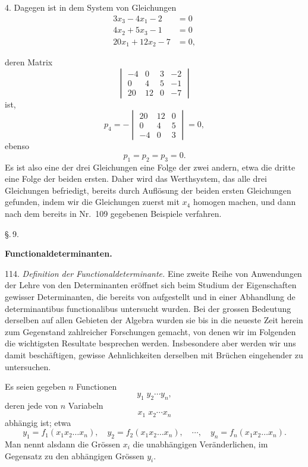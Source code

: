 4. Dagegen ist in dem System von Gleichungen
\[
\begin{aligned}
3x_3-4x_1-2&=0\\
4x_2+5x_3-1&=0\\
20x_1+12x_2-7&=0,
\end{aligned}
\]


deren Matrix
\[
\begin{vmatrix}
-4 & 0 & 3 & -2\\
0 & 4 & 5 & -1\\
20 & 12 & 0 & -7
\end{vmatrix}
\]
ist,
\[
p_4=-\begin{vmatrix} 20 & 12 & 0\\ 0 & 4 & 5\\ -4 & 0 & 3 \end{vmatrix}=0,
\]
ebenso
\[
p_1=p_2=p_3=0.
\]
Es ist also eine der drei Gleichungen eine Folge der zwei andern, etwa die dritte eine Folge der beiden ersten. Daher wird das Werthsystem, das alle drei Gleichungen befriedigt, bereits durch Auflösung der beiden ersten Gleichungen gefunden, indem wir die Gleichungen zuerst mit $x_4$ homogen machen, und dann nach dem bereits in Nr.\ 109 gegebenen Beispiele verfahren.

\begin{center}
\S.\,9.

\textbf{Functionaldeterminanten.}
\end{center}

114. \textit{Definition der Functionaldeterminante.} Eine zweite Reihe von Anwendungen der Lehre von den Determinanten eröffnet sich beim Studium der Eigenschaften gewisser Determinanten, die bereits von  aufgestellt und in einer Abhandlung \glqq de determinantibus functionalibus\grqq{} untersucht wurden. Bei der grossen Bedeutung derselben auf allen Gebieten der Algebra wurden sie bis in die neueste Zeit herein zum Gegenstand zahlreicher Forschungen gemacht, von denen wir im Folgenden die wichtigsten Resultate besprechen werden. Insbesondere aber werden wir uns damit beschäftigen, gewisse Aehnlichkeiten derselben mit Brüchen eingehender zu untersuchen.

Es seien gegeben $n$ Functionen
\[
y_1\;y_2\cdots y_n,
\]
deren jede von $n$ Variabeln
\[
x_1\;x_2\cdots x_n
\]
abhängig ist; etwa
\[
y_1=f_1(x_1x_2\ldots x_n),\quad y_2=f_2(x_1x_2\ldots x_n),\quad\cdots,\quad y_n=f_n(x_1x_2\ldots x_n).
\]
Man nennt alsdann die Grössen $x_i$ die unabhängigen Veränderlichen, im Gegensatz zu den abhängigen Grössen $y_i$.

